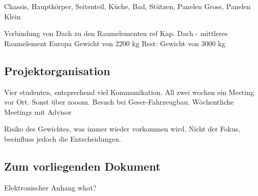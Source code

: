 Chassis, Hauptkörper, Seitenteil, Küche, Bad, Stützen, Panelen Gross, Panelen Klein

Verbindung von Dach zu den Raumelementen ref Kap. Dach - mittleres Raumelement
Europa Gewicht von 2200 kg
Rest: Gewicht von  3000 kg

\subsection{Projektorganisation}
Vier studenten, entsprechend viel Kommunikation.
All zwei wochen ein Meeting vor Ort.
Sonst über zooom.
Besuch bei Geser-Fahrzeugbau.
Wöchentliche Meetings mit Advisor

Risiko des Gewichtes, was immer wieder vorkommen wird. Nicht der Fokus, beeinfluss jedoch die Entscheidungen.


\subsection{Zum vorliegenden Dokument}
Elektronischer Anhang
what?

\newpage
